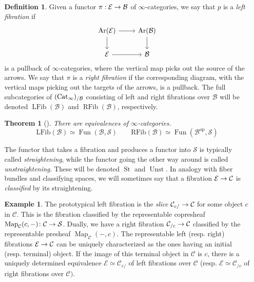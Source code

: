 \documentclass[10pt]{amsart}
\numberwithin{equation}{section}
\newtheorem{theorem}[prop]{Theorem}
\theoremstyle{definition}
\newtheorem{definition}[prop]{Definition}
\newtheorem{ex}[prop]{Example}
\DeclareMathOperator{\Map}{Map}
\DeclareMathOperator{\Fun}{Fun}
\DeclareMathOperator{\op}{op}
\DeclareMathOperator{\St}{St}
\DeclareMathOperator{\Unst}{Unst}
\DeclareMathOperator{\RFib}{RFib}
\DeclareMathOperator{\LFib}{LFib}
\newcommand{\Cat}{\mathrm{Cat}\vphantom{t}}
\newcommand{\cB}{\mathcal{B}}
\newcommand{\cC}{\mathcal{C}}
\newcommand{\cE}{\mathcal{E}}
\newcommand{\cS}{\mathcal{S}}
\renewcommand{\to}{\mathchoice{\longrightarrow}{\rightarrow}{}{}}
\begin{document}
	\begin{definition}\label{def:left/right-fib}
		Given a functor $\pi : \cE \to \cB$ of $\infty$-categories, we say that $p$ is a \emph{left fibration} if
		\[
		\begin{tikzcd}
			\mathrm{Ar}(\mathcal{E}) \arrow[r] \arrow[d] & \mathrm{Ar}(\mathcal{B}) \arrow[d] \\
			\mathcal{E} \arrow[r] & \mathcal{B}
		\end{tikzcd}
		\]
		is a pullback of $\infty$-categories, where the vertical map picks out the source of the arrows.
		We say that $\pi$ is a \emph{right fibration} if the corresponding diagram, with the vertical maps picking out the targets of the arrows, is a pullback.
		The full subcategories of $(\Cat_{\infty})_{/\cB}$ consisting of left and right fibrations over $\cB$ will be denoted $\LFib(\cB)$ and $\RFib(\cB)$, respectively.
	\end{definition}

	\begin{theorem}[{\cite{HTT}}]\label{prop:straightening_LFib}
		There are equivalences of $\infty$-categories.
		\[
		\mathrm{LFib}(\mathcal{B}) \simeq \Fun(\mathcal{B},\cS) \qquad \mathrm{RFib}(\mathcal{B}) \simeq \Fun(\mathcal{B}^{\op},\cS)
		\]
	\end{theorem}

	The functor that takes a fibration and produces a functor into $\cS$ is typically called \emph{straightening}, while the functor going the other way around is called \emph{unstraightening}.
	These will be denoted $\St$ and $\Unst$. In analogy with fiber bundles and classifying spaces, we will sometimes say that a fibration $\cE\to \cC$ is \emph{classified} by its straightening.
	\begin{ex}\label{ex:slice_fibrations}
		The prototypical left fibration is the \emph{slice} $\cC_{c/} \to \cC$ for some object $c$ in $\cC$.
    This is the fibration classified by the representable copresheaf $\Map_{\cC}(c,-)\colon \cC \to \cS$.
    Dually, we have a right fibration $\cC_{/c} \to \cC$ classified by the representable presheaf $\Map_{\cC}(-,c)$.
    The representable left (resp. right) fibrations $\cE \to \cC$ can be uniquely characterized as the ones having an initial (resp. terminal) object.
    If the image of this terminal object in $\cC$ is $c$, there is a uniquely determined equivalence $\cE \simeq \cC_{c/}$ of left fibrations over $\cC$ (resp. $\cE \simeq \cC_{/c}$ of right fibrations over $\cC)$.
	\end{ex}
\end{document}
